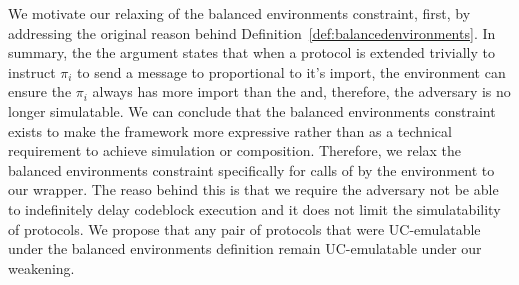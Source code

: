 We motivate our relaxing of the balanced environments constraint, first, by addressing the original reason behind Definition~\ref{def:balancedenvironments}.
In summary, the the argument states that when a protocol is extended trivially to instruct $\pi_i$ to send a message to \Adversary proportional to it's import, the environment can ensure the $\pi_i$ always has more import than the \Adversary and, therefore, the adversary is no longer simulatable. 
We can conclude that the balanced environments constraint exists to make the framework more expressive rather than as a technical requirement to achieve simulation or composition. 
Therefore, we relax the balanced environments constraint specifically for calls of \Advance by the environment to our wrapper.
The reaso behind this is that we require the adversary not be able to indefinitely delay codeblock execution and it does not limit the simulatability of protocols.
We propose that any pair of protocols that were UC-emulatable under the balanced environments definition remain UC-emulatable under our weakening.






